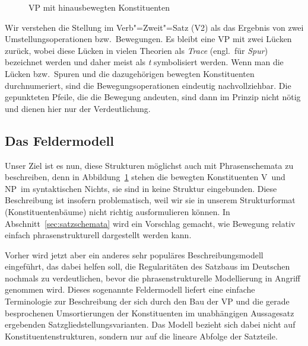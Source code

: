\begin{figure}[h]
  \vspace{0.3cm}
  \caption{VP mit hinausbewegten Konstituenten}
  \label{fig:movev2}
\end{figure}


Wir verstehen die Stellung im Verb"=Zweit"=Satz (V2) als das Ergebnis von zwei Umstellungsoperationen bzw.\ Bewegungen.
Es bleibt eine VP mit zwei Lücken zurück, wobei diese Lücken in vielen Theorien als \textit{Trace} (engl.\ für \textit{Spur}) bezeichnet werden und daher meist als \textit{t} symbolisiert werden.
Wenn man die Lücken bzw.\ Spuren und die dazugehörigen bewegten Konstituenten durchnumeriert, sind die Bewegungsoperationen eindeutig nachvollziehbar.
Die gepunkteten Pfeile, die die Bewegung andeuten, sind dann im Prinzip nicht nötig und dienen hier nur der Verdeutlichung.

\subsection{Das Feldermodell}

Unser Ziel ist es nun, diese Strukturen möglichst auch mit Phrasenschemata zu beschreiben, denn in Abbildung~\ref{fig:movev2} stehen die bewegten Konstituenten V\ORi\ und NP\ORii\ im syntaktischen Nichts, sie sind in keine Struktur eingebunden.
Diese Beschreibung ist insofern problematisch, weil wir sie in unserem Strukturformat (Konstituentenbäume) nicht richtig ausformulieren können.
In Abschnitt~\ref{sec:satzschemata} wird ein Vorschlag gemacht, wie Bewegung relativ einfach phrasenstrukturell dargestellt werden kann.

Vorher wird jetzt aber ein anderes sehr populäres Beschreibungsmodell eingeführt, das dabei helfen soll, die Regularitäten des Satzbaus im Deutschen nochmals zu verdeutlichen, bevor die phrasenstrukturelle Modellierung in Angriff genommen wird.
Dieses sogenannte Feldermodell liefert eine einfache Terminologie zur Beschreibung der sich durch den Bau der VP und die gerade besprochenen Umsortierungen der Konstituenten im unabhängigen Aussagesatz ergebenden Satzgliedstellungsvarianten.
Das Modell bezieht sich dabei nicht auf Konstituentenstrukturen, sondern nur auf die lineare Abfolge der Satzteile.

